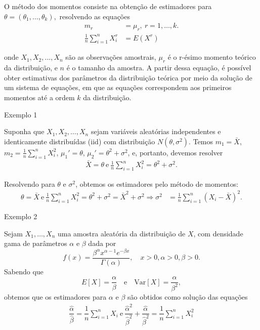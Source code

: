 \documentclass[12pt]{beamer}
\begin{document}
\begin{frame}{}
    \begin{block}{}
    \justifying
O método dos momentos consiste na obtenção de estimadores para $\theta=(\theta_{1}, \dots, \theta_{k}),$ resolvendo as equações 
\begin{align}
        m_{r}&=\mu_{r},~r=1,\dots,k.\\
        \frac{1}{n} \sum_{i=1}^{n} X_i^r &= E(X^{r})
    \end{align}


onde $X_1, X_2, ..., X_n$ são as observações amostrais, $\mu_r$ é o r-ésimo momento teórico da distribuição, e $n$ é o tamanho da amostra. A partir dessa equação, é possível obter estimativas dos parâmetros da distribuição teórica por meio da solução de um sistema de equações, em que as equações correspondem aos primeiros momentos até a ordem $k$ da distribuição.
\end{block}
\end{frame}

\begin{frame}{Exemplo 1}
\begin{block}{}
\justifying
Suponha que \(X_1, X_2, \ldots, X_n\) sejam variáveis aleatórias independentes e identicamente distribuídas (iid) com distribuição \(N(\theta, \sigma^2)\). Temos \(m_1 = \bar{X}\), \(m_2 = {\displaystyle \frac{1}{n} \sum_{i=1}^{n} X_i^2}\), \(\mu_1' = \theta\), \(\mu_2' = \theta^{2}+\sigma^2\), e, portanto, devemos resolver
\begin{align*}
\bar{X} = \theta~\text{e}~{\displaystyle \frac{1}{n} \sum_{i=1}^{n} X_i^2} = \theta^{2}+\sigma^2.
\end{align*}

Resolvendo para \(\theta\) e \(\sigma^2\), obtemos os estimadores pelo método de momentos:
\begin{align*}
\theta = \bar{X}~\text{e}~{\displaystyle \frac{1}{n} \sum_{i=1}^{n}X_{i}^{2}=\theta^{2}+\sigma^{2}}=\bar{X}^{2}+\sigma^{2}\Rightarrow \sigma^2 &= \frac{1}{n} \sum_{i=1}^{n} (X_i - \bar{X})^2.
\end{align*}
\end{block}
\end{frame}

\begin{frame}{Exemplo 2}
\begin{block}{}
\justifying
Sejam \(X_1, \ldots, X_n\) uma amostra aleatória da distribuição de \(X\), com densidade gama de parâmetros \(\alpha\) e \(\beta\) dada por
\[
f(x) = \frac{\beta^\alpha x^{\alpha-1} e^{-\beta x}}{\Gamma(\alpha)}, \quad x > 0, \alpha > 0, \beta > 0.
\]
Sabendo que
\[
E[X] = \frac{\alpha}{\beta} \quad \text{e} \quad \text{Var}[X] = \frac{\alpha}{\beta^2},
\]
obtemos que os estimadores para \(\alpha\) e \(\beta\) são obtidos como solução das equações
\begin{align*}
\dfrac{\hat{\alpha}}{\hat{\beta}}=\dfrac{1}{n}{\displaystyle \sum_{i=1}^{n}X_{i}}~\text{e}~\dfrac{\hat{\alpha}^{2}}{\hat{\beta}^{2}}+\dfrac{\hat{\alpha}}{\hat{\beta}^{2}}=\dfrac{1}{n}{\displaystyle \sum_{i=1}^{n}X_{i}^{2}}
\end{align*}
\end{block}
\end{frame}
\end{document}
